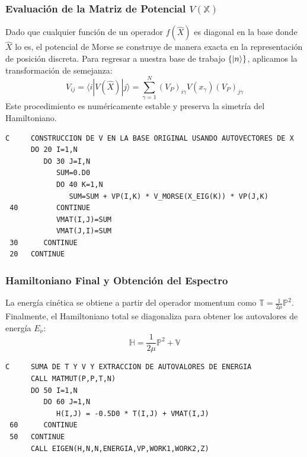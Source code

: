 \documentclass[11pt,fleqn]{article}
\begin{document}
\subsubsection{Evaluación de la Matriz de Potencial $V(\mathbb{X})$}

Dado que cualquier función de un operador $f(\hat{X})$ es diagonal en la base donde $\hat{X}$ lo es, el potencial de Morse se construye de manera exacta en la representación de posición discreta. Para regresar a nuestra base de trabajo $\{ \ket{n} \}$, aplicamos la transformación de semejanza:
\begin{equation}
    V_{ij} = \langle i | V(\hat{X}) | j \rangle = \sum_{\gamma=1}^N (V_P)_{i\gamma} V(x_\gamma) (V_P)_{j\gamma}
\end{equation}
Este procedimiento es numéricamente estable y preserva la simetría del Hamiltoniano.

\begin{lstlisting}[caption=Construcción de la matriz de potencial mediante transformación unitaria]
C     CONSTRUCCION DE V EN LA BASE ORIGINAL USANDO AUTOVECTORES DE X
      DO 20 I=1,N
         DO 30 J=I,N
            SUM=0.D0
            DO 40 K=1,N
               SUM=SUM + VP(I,K) * V_MORSE(X_EIG(K)) * VP(J,K)
 40         CONTINUE
            VMAT(I,J)=SUM
            VMAT(J,I)=SUM
 30      CONTINUE
 20   CONTINUE
\end{lstlisting}

\subsubsection{Hamiltoniano Final y Obtención del Espectro}

La energía cinética se obtiene a partir del operador momentum como $\mathbb{T} = \frac{1}{2\mu}\mathbb{P}^2$. Finalmente, el Hamiltoniano total se diagonaliza para obtener los autovalores de energía $E_\nu$:
\begin{equation}
    \mathbb{H} = \frac{1}{2\mu} \mathbb{P}^2 + \mathbb{V}
\end{equation}

\begin{lstlisting}[caption=Diagonalización final del Hamiltoniano total]
C     SUMA DE T Y V Y EXTRACCION DE AUTOVALORES DE ENERGIA
      CALL MATMUT(P,P,T,N)
      DO 50 I=1,N
         DO 60 J=1,N
            H(I,J) = -0.5D0 * T(I,J) + VMAT(I,J)
 60      CONTINUE
 50   CONTINUE
      CALL EIGEN(H,N,N,ENERGIA,VP,WORK1,WORK2,Z)
\end{lstlisting}
\end{document}
